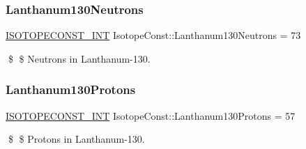 \subsubsection{\texorpdfstring{Lanthanum130\+Neutrons}{Lanthanum130Neutrons}}
{\footnotesize\ttfamily \mbox{\hyperlink{group___isotope_const-_macros_ga5f18360b3e99483a35c32d789e62621c}{I\+S\+O\+T\+O\+P\+E\+C\+O\+N\+S\+T\+\_\+\+I\+NT}} Isotope\+Const\+::\+Lanthanum130\+Neutrons = 73}

\$ \$ Neutrons in Lanthanum-\/130. \mbox{\label{group___isotope_const-_lanthanum-_la130_ga0ddd321c267a9c8ec8af3cb6695f8a67}} 
\subsubsection{\texorpdfstring{Lanthanum130\+Protons}{Lanthanum130Protons}}
{\footnotesize\ttfamily \mbox{\hyperlink{group___isotope_const-_macros_ga5f18360b3e99483a35c32d789e62621c}{I\+S\+O\+T\+O\+P\+E\+C\+O\+N\+S\+T\+\_\+\+I\+NT}} Isotope\+Const\+::\+Lanthanum130\+Protons = 57}

\$ \$ Protons in Lanthanum-\/130. 